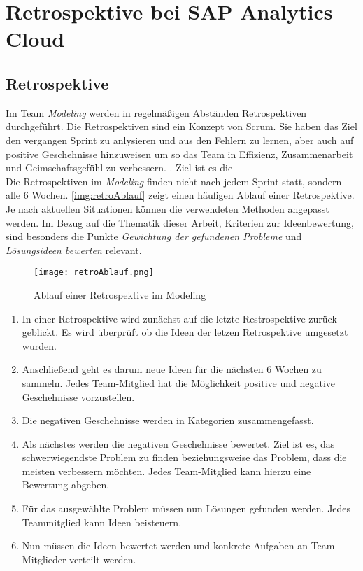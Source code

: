 \section{Retrospektive bei SAP Analytics Cloud}\label{sec:retro}
\subsection{Retrospektive}
Im Team \textit{Modeling} werden in regelmäßigen Abständen Retrospektiven durchgeführt. 
Die Retrospektiven sind ein Konzept von Scrum. Sie haben das Ziel den vergangen Sprint zu anlysieren und aus den Fehlern zu lernen, aber auch  auf positive 
Geschehnisse hinzuweisen um so das Team in Effizienz, Zusammenarbeit und Geimschaftsgefühl zu verbessern. \cite{retro:2018}. Ziel ist es die \\
Die Retrospektiven im \textit{Modeling} finden nicht nach jedem Sprint statt, sondern alle 6 Wochen.
\autoref{img:retroAblauf} zeigt einen häufigen Ablauf einer Retrospektive. Je nach aktuellen Situationen können die 
verwendeten Methoden angepasst werden. Im Bezug auf die Thematik dieser Arbeit, Kriterien zur Ideenbewertung,  
sind besonders die Punkte \textit{Gewichtung der gefundenen Probleme} und \textit{Lösungsideen bewerten} relevant.
\begin{figure}[ht]
	\centering
	\texttt{[image: retroAblauf.png]}
    \caption{Ablauf einer Retrospektive im Modeling}
	\label{img:retroAblauf}
\end{figure}
\begin{enumerate}
    \item In einer Retrospektive wird zunächst auf die letzte Restrospektive zurück geblickt. Es wird überprüft ob die Ideen der letzen 
        Retrospektive umgesetzt wurden.
    \item Anschließend geht es darum neue Ideen für die nächsten 6 Wochen zu sammeln. Jedes Team-Mitglied
        hat die Möglichkeit positive und negative Geschehnisse vorzustellen. 
    \item Die negativen Geschehnisse werden in Kategorien zusammengefasst. 
    \item Als nächstes werden die negativen Geschehnisse bewertet. Ziel ist es, das schwerwiegendste Problem zu finden beziehungsweise 
    das Problem, dass die meisten verbessern möchten. Jedes Team-Mitglied kann hierzu eine Bewertung abgeben. 
    \item Für das ausgewählte Problem müssen nun Lösungen gefunden werden. Jedes Teammitglied kann Ideen beisteuern. 
    \item Nun müssen die Ideen bewertet werden und konkrete Aufgaben an Team-Mitglieder verteilt werden.
\end{enumerate}

